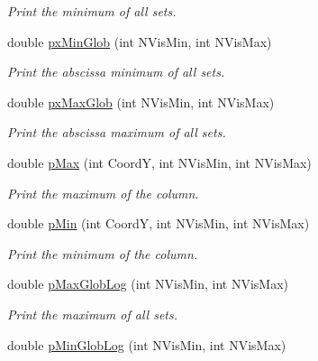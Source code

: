 \begin{DoxyCompactItemize}
\begin{DoxyCompactList}\small\item\em \-Print the minimum of all sets. \end{DoxyCompactList}\item 
\hypertarget{classVarDatFile_a6c9b0181c2505369c375bcb91f36409f}{double \hyperlink{classVarDatFile_a6c9b0181c2505369c375bcb91f36409f}{px\-Min\-Glob} (int \-N\-Vis\-Min, int \-N\-Vis\-Max)}\label{classVarDatFile_a6c9b0181c2505369c375bcb91f36409f}

\begin{DoxyCompactList}\small\item\em \-Print the abscissa minimum of all sets. \end{DoxyCompactList}\item 
\hypertarget{classVarDatFile_ab594ce06a5fb24acf5c812f2d02fde06}{double \hyperlink{classVarDatFile_ab594ce06a5fb24acf5c812f2d02fde06}{px\-Max\-Glob} (int \-N\-Vis\-Min, int \-N\-Vis\-Max)}\label{classVarDatFile_ab594ce06a5fb24acf5c812f2d02fde06}

\begin{DoxyCompactList}\small\item\em \-Print the abscissa maximum of all sets. \end{DoxyCompactList}\item 
double \hyperlink{classVarDatFile_a3aea9835fc67f13c5b334e1a34af1be9}{p\-Max} (int \-Coord\-Y, int \-N\-Vis\-Min, int \-N\-Vis\-Max)
\begin{DoxyCompactList}\small\item\em \-Print the maximum of the column. \end{DoxyCompactList}\item 
double \hyperlink{classVarDatFile_afd9d7e4b40e8991b685d17cb65a38441}{p\-Min} (int \-Coord\-Y, int \-N\-Vis\-Min, int \-N\-Vis\-Max)
\begin{DoxyCompactList}\small\item\em \-Print the minimum of the column. \end{DoxyCompactList}\item 
\hypertarget{classVarDatFile_ad89c34d0afecf90978d5e36bf57e1bf0}{double \hyperlink{classVarDatFile_ad89c34d0afecf90978d5e36bf57e1bf0}{p\-Max\-Glob\-Log} (int \-N\-Vis\-Min, int \-N\-Vis\-Max)}\label{classVarDatFile_ad89c34d0afecf90978d5e36bf57e1bf0}

\begin{DoxyCompactList}\small\item\em \-Print the maximum of all sets. \end{DoxyCompactList}\item 
\hypertarget{classVarDatFile_ad47c958de7bca595ab42666050cac660}{double \hyperlink{classVarDatFile_ad47c958de7bca595ab42666050cac660}{p\-Min\-Glob\-Log} (int \-N\-Vis\-Min, int \-N\-Vis\-Max)}\label{classVarDatFile_ad47c958de7bca595ab42666050cac660}


\end{DoxyCompactItemize}
